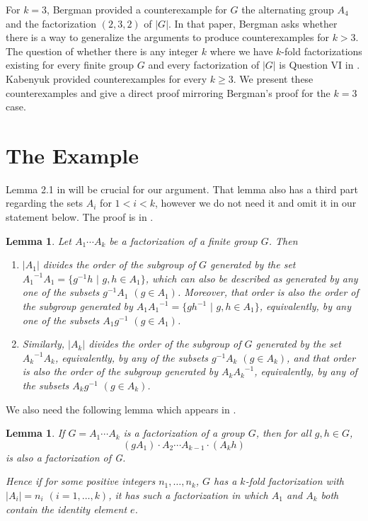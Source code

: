 \documentclass{amsart}
\newtheorem{lemma}[theorem]{Lemma}
\begin{document}
For $k=3$, Bergman \cite{berg} provided a counterexample for $G$ the alternating group $A_4$ and the factorization $(2,3,2)$ of $|G|$.  In that paper, Bergman asks whether there is a way to generalize the arguments to produce counterexamples for $k > 3$.  The question of whether there is any integer $k$ where we have $k$-fold factorizations existing for every finite group $G$ and every factorization of $|G|$ is Question VI in \cite{hoosh1}.  Kabenyuk \cite{kab} provided counterexamples for every $k \geq 3$.  We present these counterexamples and give a direct proof mirroring Bergman's proof for the $k=3$ case.

\section{The Example}

Lemma 2.1 in \cite{berg} will be crucial for our argument.  That lemma also has a third part regarding the sets $A_i$ for $1 < i < k$, however we do not need it and omit it in our statement below.  The proof is in \cite{berg}.

\begin{lemma}\label{lem: first_last}
Let $A_1 \cdots A_k$ be a factorization of a finite group $G$. Then
\begin{enumerate}
\item $|A_1|$ divides the order of the subgroup of $G$ generated by the set ${A_1}^{-1} A_1 = \{ g^{-1}h \,\, | \,\, g,h \in A_1 \}$, which can also be described as generated by any one of the subsets $g^{-1} A_1$ $(g \in A_1)$.  Moreover, that order is also the order of the subgroup generated by $A_1{A_1}^{-1} = \{ gh^{-1} \,\, | \,\, g,h \in A_1 \}$, equivalently, by any one of the subsets $A_1 g^{-1}$ $(g \in A_1)$.
\item Similarly, $|A_k|$ divides the order of the subgroup of $G$ generated by the set ${A_k}^{-1} A_k$, equivalently, by any of the subsets $g^{-1} A_k$ $(g \in A_k)$, and that order is also the order of the subgroup generated by $A_k{A_k}^{-1}$, equivalently, by any of the subsets $A_k g^{-1}$ $(g \in A_k)$.
\end{enumerate}
\end{lemma}

We also need the following lemma which appears in \cite{berg, sands}. 

\begin{lemma}\label{lem: e}
If $G = A_1 \cdots A_k$ is a factorization of a group $G$, then for all $g,h \in G$, $$(gA_1) \cdot A_2 \cdots A_{k-1} \cdot (A_k h)$$ is also a factorization of G.

Hence if for some positive integers $n_1, \dots, n_k$, $G$ has a $k$-fold factorization with $|A_i| = n_i$ $(i = 1, \dots, k)$, it has such a factorization in which $A_1$ and $A_k$ both contain the identity element $e$.
\end{lemma}
\end{document}

